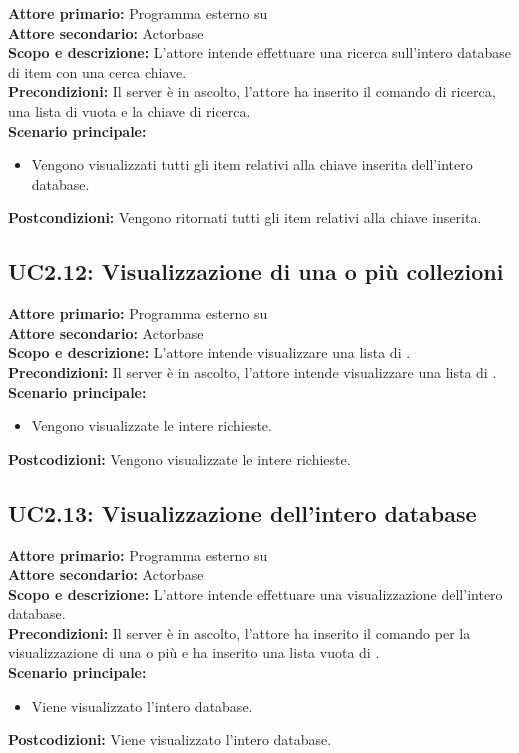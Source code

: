 \documentclass{scalatekids-article}
\begin{document}
\textbf{Attore primario:} Programma esterno su \\
\textbf{Attore secondario:} Actorbase\\
\textbf{Scopo e descrizione:}
L'attore intende effettuare una ricerca sull'intero database di item con una cerca chiave.\\
\textbf{Precondizioni:} Il server è in ascolto, l'attore ha inserito il comando di ricerca, una lista di  vuota e la chiave di ricerca.\\
\textbf{Scenario principale:}
\begin{itemize}
\item Vengono visualizzati tutti gli item relativi alla chiave inserita dell'intero database.
\end{itemize}
\textbf{Postcondizioni:} Vengono ritornati tutti gli item relativi alla chiave inserita.

\subsection{UC2.12: Visualizzazione di una o più collezioni}

\textbf{Attore primario:} Programma esterno su \\
\textbf{Attore secondario:} Actorbase\\
\textbf{Scopo e descrizione:} L'attore intende visualizzare una lista di .\\
\textbf{Precondizioni:} Il server è in ascolto, l'attore intende visualizzare una lista di .\\
\textbf{Scenario principale:}
\begin{itemize}
\item Vengono visualizzate le intere  richieste.
\end{itemize}
\textbf{Postcodizioni:} Vengono visualizzate le intere  richieste.

\subsection{UC2.13: Visualizzazione dell'intero database}

\textbf{Attore primario:} Programma esterno su \\
\textbf{Attore secondario:} Actorbase\\
\textbf{Scopo e descrizione:} L'attore intende effettuare una visualizzazione  dell'intero database.\\
\textbf{Precondizioni:} Il server è in ascolto, l'attore ha inserito il comando per la visualizzazione di una o più  e ha inserito una lista vuota di .\\
\textbf{Scenario principale:}
\begin{itemize}
\item Viene visualizzato l'intero database.
\end{itemize}
\textbf{Postcodizioni:} Viene visualizzato l'intero database.
\end{document}
